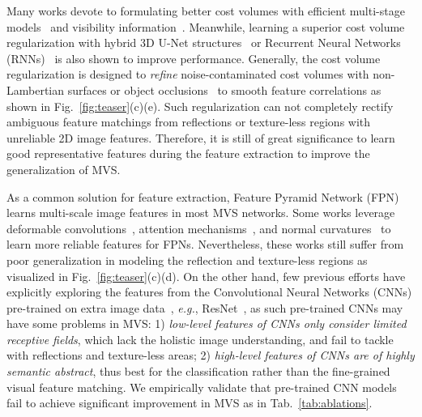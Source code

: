 \documentclass[10pt]{article} \usepackage[preprint]{tmlr}
\begin{document}
Many works devote to formulating better cost volumes with efficient multi-stage models~\citep{gu2020cascade,yang2020cost,mi2021generalized} and visibility information~\citep{zhang2020visibility,xu2020pvsnet}. Meanwhile, learning a superior cost volume regularization with hybrid 3D U-Net structures~\citep{luo2019p,sormann2020bp} or Recurrent Neural Networks (RNNs)~\citep{yao2019recurrent,wei2021aa,wei2022bidirectional} is also shown to improve performance. Generally, the cost volume regularization is  designed to \textit{refine} noise-contaminated cost volumes with non-Lambertian surfaces or object occlusions~\citep{yao2018mvsnet} to smooth feature correlations as shown in Fig.~\ref{fig:teaser}(c)(e). 
Such regularization can not completely rectify ambiguous feature matchings from reflections or texture-less regions with unreliable 2D image features. Therefore, it is still of great significance to learn good representative features during the feature extraction to improve the generalization of MVS.

As a common solution for feature extraction, Feature Pyramid Network (FPN)~\citep{lin2017feature} learns multi-scale image features in most MVS networks. 
Some works leverage deformable convolutions~\citep{wang2021patchmatchnet,wei2021aa,ding2021transmvsnet}, attention mechanisms~\citep{yi2020pyramid,zhu2021multi,ding2021transmvsnet}, and normal curvatures~\citep{Xu_2020_CVPR,giang2021curvature} to learn more reliable features for FPNs.
Nevertheless, these works still suffer from poor generalization in modeling the reflection and texture-less regions as visualized in Fig.~\ref{fig:teaser}(c)(d). On the other hand, few previous efforts have explicitly exploring the features from the Convolutional Neural Networks (CNNs) pre-trained on extra image data~\citep{ding2022kd}, \emph{e.g.}, ResNet~\citep{he2016identity}, as such pre-trained CNNs may have some  problems in MVS:
1) \textit{low-level features of CNNs only consider limited receptive fields}, which lack the holistic image understanding, and fail to tackle with reflections and texture-less areas;
2) \textit{high-level features of CNNs are of highly semantic abstract}, thus best for the classification rather than the fine-grained visual feature matching.
We empirically validate that pre-trained CNN models fail to achieve significant improvement in MVS as in Tab.~\ref{tab:ablations}.
\end{document}
